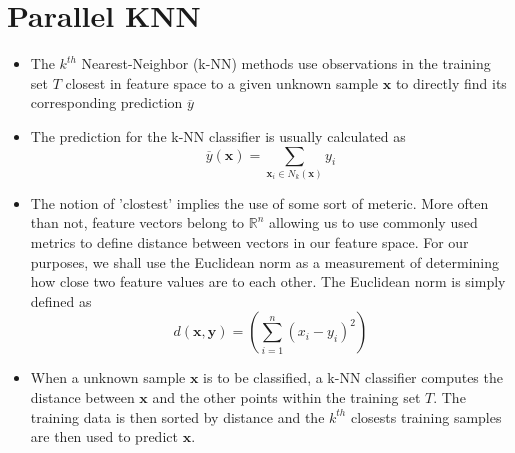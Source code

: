 \section{Parallel KNN}

\begin{itemize}
    \item The $k^{th}$ Nearest-Neighbor (k-NN) methods use observations in the training set $T$ closest in feature space to a given unknown sample $\bm{x}$ to directly find its corresponding prediction $\overline{y}$
    \item The prediction for the k-NN classifier is usually calculated as 
    \[
        \overline{y} \left( \bm{x} \right) = \sum_{\bm{x}_{i} \in N_{k} (\bm{x})} y_{i}
    \]
    \item The notion of 'clostest' implies the use of some sort of meteric. More often than not, feature vectors belong to $\mathbb{R}^{n}$ allowing us to use commonly used metrics to define distance between vectors in our feature space. For our purposes, we shall use the Euclidean norm as a measurement of determining how close two feature values are to each other. The Euclidean norm is simply defined as
    \[
        d \left( \bm{x}, \bm{y} \right) = \left( \sum_{i=1}^{n} \left( x_{i} - y_{i} \right)^{2} \right)
    \]
    \item When a unknown sample $\bm{x}$ is to be classified, a k-NN classifier computes the distance between $\bm{x}$ and the other points within the training set $T$. The training data is then sorted by distance and the $k^{th}$ closests training samples are then used to predict $\bm{x}$.
\end{itemize}
